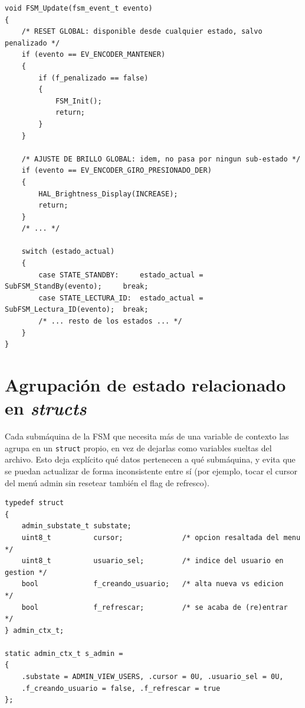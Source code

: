 \documentclass[11pt,a4paper]{article}
\begin{document}
\begin{lstlisting}[caption={\texttt{FSM\_Update()}: eventos globales interceptados antes del despacho por estado.}, label={lst:fsmupdate}]
void FSM_Update(fsm_event_t evento)
{
    /* RESET GLOBAL: disponible desde cualquier estado, salvo penalizado */
    if (evento == EV_ENCODER_MANTENER)
    {
        if (f_penalizado == false)
        {
            FSM_Init();
            return;
        }
    }

    /* AJUSTE DE BRILLO GLOBAL: idem, no pasa por ningun sub-estado */
    if (evento == EV_ENCODER_GIRO_PRESIONADO_DER)
    {
        HAL_Brightness_Display(INCREASE);
        return;
    }
    /* ... */

    switch (estado_actual)
    {
        case STATE_STANDBY:     estado_actual = SubFSM_StandBy(evento);     break;
        case STATE_LECTURA_ID:  estado_actual = SubFSM_Lectura_ID(evento);  break;
        /* ... resto de los estados ... */
    }
}
\end{lstlisting}


\section{Agrupación de estado relacionado en \textit{structs}}

Cada submáquina de la FSM que necesita más de una variable de contexto las
agrupa en un \lstinline{struct} propio, en vez de dejarlas como variables
sueltas del archivo. Esto deja explícito qué datos pertenecen a qué
submáquina, y evita que se puedan actualizar de forma inconsistente entre
sí (por ejemplo, tocar el cursor del menú admin sin resetear también el
flag de refresco).

\begin{lstlisting}[caption={Contexto del modo administrador agrupado en un \textit{struct} (\texttt{fsm.c}).}, label={lst:adminctx}]
typedef struct
{
    admin_substate_t substate;
    uint8_t          cursor;              /* opcion resaltada del menu     */
    uint8_t          usuario_sel;         /* indice del usuario en gestion */
    bool             f_creando_usuario;   /* alta nueva vs edicion         */
    bool             f_refrescar;         /* se acaba de (re)entrar        */
} admin_ctx_t;

static admin_ctx_t s_admin =
{
    .substate = ADMIN_VIEW_USERS, .cursor = 0U, .usuario_sel = 0U,
    .f_creando_usuario = false, .f_refrescar = true
};
\end{lstlisting}
\end{document}
